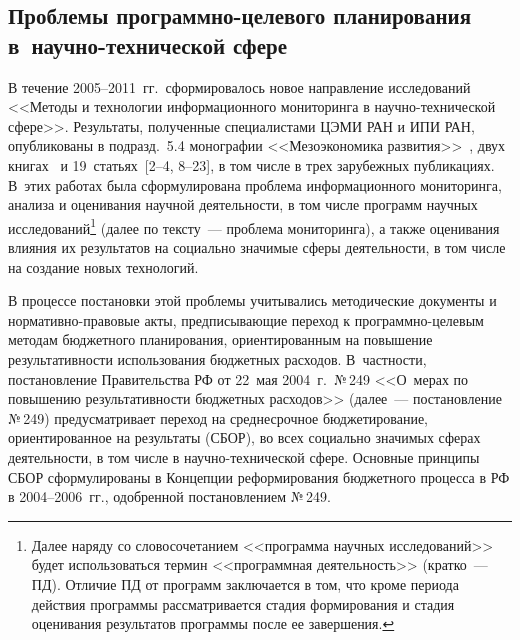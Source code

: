 \begin{multicols}{2}
\section{Проблемы программно-целевого планирования 
в~научно-технической сфере}

В течение 2005--2011~гг.\ сформировалось новое направление исследований <<Методы и 
технологии информационного мониторинга в научно-тех\-ни\-че\-ской сфере>>. Результаты, 
полученные специалистами ЦЭМИ РАН и ИПИ РАН, опубликованы в подразд.~5.4 монографии 
<<Мезоэкономика развития>>~\cite{5-zat}, двух книгах~\cite{6-zat, 7-zat} и 
19~статьях~[2--4, 8--23], в том чис\-ле в трех зарубежных публикациях. В~этих работах была сформулирована проблема 
информационного мониторинга, анализа и оценивания научной деятельности, в том
чис\-ле программ научных 
исследований\footnote{Далее наряду со словосочетанием <<программа научных исследований>> будет 
использоваться термин <<программная деятельность>> (кратко~--- ПД). Отличие ПД от программ 
заключается в том, что кроме периода действия программы рассматривается стадия формирования и 
стадия оценивания результатов программы после ее завершения.} (далее по тексту~--- проблема 
мониторинга), а также оценивания влияния их результатов на социально
значимые сферы деятельности, в том чис\-ле на 
создание новых технологий.

    В процессе постановки этой проблемы учитывались методические документы и 
    нор\-ма\-тив\-но-пра\-во\-вые акты, предписывающие переход к про\-грам\-мно-це\-ле\-вым 
методам бюджетного планирования, ориентированным на повышение результативности 
использования бюджетных расходов. В~частности, постановление Правительства РФ от 22~мая 
2004~г.\ №\,249 <<О~мерах по повышению результативности бюджетных расходов>> 
    (далее~--- постановление №\,249) предусматривает переход на среднесрочное 
бюджетирование, ориентированное на результаты (СБОР), во всех социально значимых сферах 
деятельности, в том числе в на\-уч\-но-тех\-ни\-че\-ской сфере. Основные принципы СБОР 
сформулированы в Концепции реформирования бюджетного процесса в РФ в 2004--2006~гг., 
одобренной постановлением №\,249.
    

\end{multicols}
